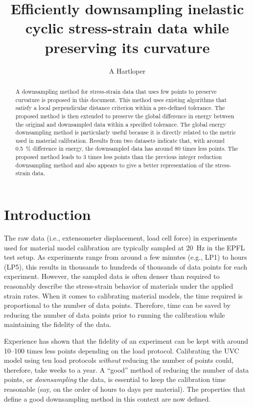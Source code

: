 \documentclass[a4paper,11pt]{article}
\title{Efficiently downsampling inelastic cyclic stress-strain data while preserving its curvature}
\author{A Hartloper}
\begin{document}
\maketitle

\begin{abstract}
    A downsampling method for stress-strain data that uses few points to preserve curvature is proposed in this document.
    This method uses existing algorithms that satisfy a local perpendicular distance criterion within a pre-defined tolerance.
    The proposed method is then extended to preserve the global difference in energy between the original and downsampled data within a specified tolerance.
    The global energy downsampling method is particularly useful because it is directly related to the metric used in material calibration.
    Results from two datasets indicate that, with around 0.5~\% difference in energy, the downsampled data has around 80 times less points.
    The proposed method leads to 3 times less points than the previous integer reduction downsampling method and also appears to give a better representation of the stress-strain data.
\end{abstract}

\section{Introduction}

The raw data (i.e., extensometer displacement, load cell force) in experiments used for material model calibration are typically sampled at 20~Hz in the EPFL test setup.
As experiments range from around a few minutes (e.g., LP1) to hours (LP5), this results in thousands to hundreds of thousands of data points for each experiment.
However, the sampled data is often denser than required to reasonably describe the stress-strain behavior of materials under the applied strain rates.
When it comes to calibrating material models, the time required is proportional to the number of data points.
Therefore, time can be saved by reducing the number of data points prior to running the calibration while maintaining the fidelity of the data.

Experience has shown that the fidelity of an experiment can be kept with around 10--100 times less points depending on the load protocol.
Calibrating the UVC model using ten load protocols \emph{without} reducing the number of points could, therefore, take weeks to a year.
A ``good'' method of reducing the number of data points, or \emph{downsampling} the data, is essential to keep the calibration time reasonable (say, on the order of hours to days per material).
The properties that define a good downsampling method in this context are now defined.
\end{document}
